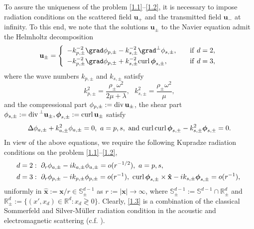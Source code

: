\documentclass[final,reqno]{siamltex}
\newcommand{\om}{\omega}
\newcommand{\pa}{\partial}
\newcommand{\curl}{{\rm curl\,}}
\newcommand{\dive}{{\rm div\,}}
\newcommand{\mat}{\mathbb}
\newcommand{\R}{{\mat R}}
\newcommand{\Sp}{{\mat S}}
\begin{document}
To assure the uniqueness of the problem \eqref{1.1}--\eqref{1.2}, it is necessary to impose radiation conditions on the scattered field $\mathbf{u}_+$ and the transmitted field $\mathbf{u}_-$ at infinity. To this end, we note that the solutions $\mathbf{u}_\pm$ to the Navier equation admit the Helmholtz decomposition 
\begin{align*}
  \mathbf{u}_\pm=
  \left\{
  \begin{array}{ll}
  	\displaystyle-k_{p,\pm}^{-2}\grad\phi_{p,\pm}-k_{s,\pm}^{-2}\grad^\perp\phi_{s,\pm},~~~&{\rm if}~d=2,\\ [1mm]
  	\displaystyle-k_{p,\pm}^{-2}\grad\phi_{p,\pm}+k_{s,\pm}^{-2}\curl\boldsymbol{\phi}_{s,\pm},~~~&{\rm if}~d=3, 
  \end{array}
  \right.
\end{align*}
where the wave numbers $k_{p,\pm}$ and $k_{s,\pm}$ satisfy 
$$
  k_{p,\pm}^2=\frac{\rho_\pm\om^2}{2\mu+\lambda},~~~k_{s,\pm}^2=\frac{\rho_\pm\om^2}{\mu}, 
$$
and the compressional part $\phi_{p,\pm}:=\dive \mathbf{u}_\pm$, the shear part $\phi_{s,\pm}:=\dive^\perp\mathbf{u}_\pm, \boldsymbol{\phi}_{s,\pm}:=\curl\mathbf{u}_\pm$ satisfy 
$$
  \Delta\phi_{a,\pm}+k_{a,\pm}^2\phi_{a,\pm}=0,~a=p,s,~\text{and}~\curl\curl\boldsymbol{\phi}_{s,\pm}-k_{s,\pm}^2\boldsymbol{\phi}_{s,\pm}=0. 
$$
In view of the above equations, we require the following Kupradze radiation conditions on the problem \eqref{1.1}--\eqref{1.2}, 
\begin{subequations}\label{1.3}
	\begin{align}\label{1.3a}
	&d=2:~\pa_r\phi_{a,\pm}-ik_{a,\pm}\phi_{a,\pm}=o(r^{-1/2}),~a=p,s,~ \\
	\label{1.3b}
	&d=3:~\pa_r\phi_{p,\pm}-ik_{p,\pm}\phi_{p,\pm}=o(r^{-1}),~\curl\boldsymbol{\phi}_{s,\pm}\times\mathbf{\hat x}-ik_{s,\pm}\boldsymbol{\phi}_{s,\pm}=o(r^{-1}), ~
	\end{align}
\end{subequations}
uniformly in $\mathbf{\hat x}:=\mathbf{x}/r\in \Sp^{d-1}_\pm$ as $r:=|\mathbf{x}|\rightarrow\infty$, where
$\Sp^{d-1}_\pm:=\Sp^{d-1}\cap\R^d_\pm$ and $\R^d_\pm:=\{(x',x_d)\in \R^d:x_d\gtrless0\}$. Clearly, \eqref{1.3} is a combination of the classical Sommerfeld and Silver-M\"{u}ller radiation condition in the acoustic and electromagnetic scattering (c.f. \cite{FD06,DR13}). 
\end{document}
